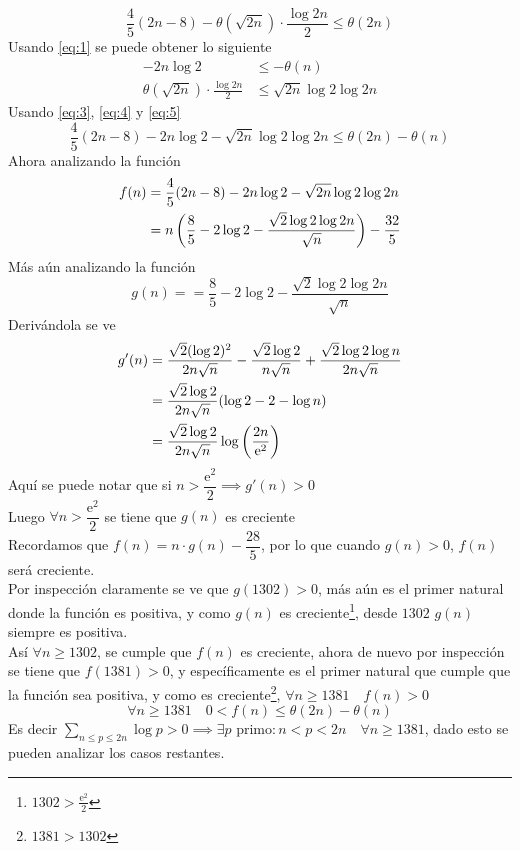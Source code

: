 \begin{sol}
\begin{equation}
		\frac45(2n-8)-\theta(\sqrt{2n})\cdot\frac{\log2n}{2}\leq\theta(2n)\label{eq:3}
	\end{equation}
	Usando \eqref{eq:1} se puede obtener lo siguiente
	\begin{align}
		-2n\log2&\leq-\theta(n)\label{eq:4}\\
		\theta(\sqrt{2n})\cdot\frac{\log2n}{2}&\leq\sqrt{2n}\log2\log2n\label{eq:5}
	\end{align}
	Usando \eqref{eq:3}, \eqref{eq:4} y \eqref{eq:5}
	\begin{equation*}
		\frac45(2n-8)-2n\log2-\sqrt{2n}\log2\log2n\leq\theta(2n)-\theta(n)
	\end{equation*}
	Ahora analizando la función
	\begin{align*}
		f(n)&=\frac45(2n-8)-2n\log2-\sqrt{2n}\log2\log2n\\
		&=n\left(\frac85-2\log2-\frac{\sqrt2\log2\log2n}{\sqrt{n}}\right)-\frac{32}5
	\end{align*}
	Más aún analizando la función
	\[g(n)==\frac85-2\log2-\frac{\sqrt2\log2\log2n}{\sqrt{n}}\]
	Derivándola se ve
	\begin{align*}
		g'(n)&=\frac{\sqrt2(\log2)^2}{2n\sqrt{n}}-\frac{\sqrt2\log2}{n\sqrt{n}}+\frac{\sqrt2\log2\log n}{2n\sqrt{n}}\\
		&=\frac{\sqrt2\log2}{2n\sqrt{n}}(\log2-2-\log{n})\\
		&=\frac{\sqrt2\log2}{2n\sqrt{n}}\log\left(\frac{2n}{\mathrm{e}^2}\right)
	\end{align*}
	Aquí se puede notar que si $n>\dfrac{\mathrm{e}^2}2\implies g'(n)>0$\\
	Luego $\forall n>\dfrac{\mathrm{e}^2}2$ se tiene que $g(n)$ es creciente\\
	Recordamos que $f(n)=n\cdot g(n)-\dfrac{28}5$, por lo que cuando $g(n)>0$, $f(n)$ será creciente.\\
	Por inspección claramente se ve que $g(1302)>0$, más aún es el primer natural donde la función es positiva, y como $g(n)$ es creciente\footnote{$1302>\frac{\mathrm{e}^2}2$}, desde $1302$ $g(n)$ siempre es positiva.\\
	Así $\forall n\geq1302$, se cumple que $f(n)$ es creciente, ahora de nuevo por inspección se tiene que $f(1381)>0$, y específicamente es el primer natural que cumple que la función sea positiva, y como es creciente\footnote{$1381>1302$}, $\forall n\geq1381\quad f(n)>0$\\
	\[\forall n\geq1381\quad0<f(n)\leq\theta(2n)-\theta(n)\]
	Es decir $\displaystyle\sum_{n\leq p\leq 2n}\log{p}>0\implies\exists p\text{ primo}:n<p<2n\quad\forall n\geq1381$, dado esto se pueden analizar los casos restantes.

\end{sol}
